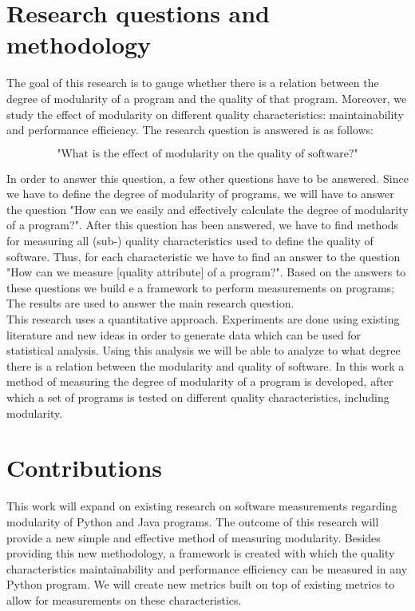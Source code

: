 \documentclass[twoside]{uva-inf-bachelor-thesis}
\begin{document}
\section{Research questions and methodology}
The goal of this research is to gauge whether there is a relation between the degree of modularity of a program and the quality of that program. Moreover, we study the effect of modularity on different quality characteristics: maintainability and performance efficiency. The research question is answered is as follows:

\[ \text{"What is the effect of modularity on the quality of software?"} \]

In order to answer this question, a few other questions have to be answered. Since we have to define the degree of modularity of programs, we will have to answer the question "How can we easily and effectively calculate the degree of modularity of a program?". After this question has been answered, we have to find methods for measuring all (sub-) quality characteristics used to define the quality of software. Thus, for each characteristic we have to find an answer to the question "How can we measure [quality attribute] of a program?". Based on the answers to these questions we build e a framework to perform measurements on programs; The results are used to answer the main research question.\\

This research uses a quantitative approach. Experiments are done using existing literature and new ideas in order to generate data which can be used for statistical analysis. Using this analysis we will be able to analyze to what degree there is a relation between the modularity and quality of software. In this work a method of measuring the degree of modularity of a program is developed, after which a set of programs is tested on different quality characteristics, including modularity.

\section{Contributions}
This work will expand on existing research on software measurements regarding modularity\cite{BetterCodeHub,visser2016building,emanuel2013modularity} of Python and Java programs. The outcome of this research will provide a new simple and effective method of measuring modularity. Besides providing this new methodology, a framework is created with which the quality characteristics maintainability and performance efficiency can be measured in any Python program. We will create new metrics built on top of existing metrics\cite{heitlager2016practical} to allow for measurements on these characteristics.
\end{document}
